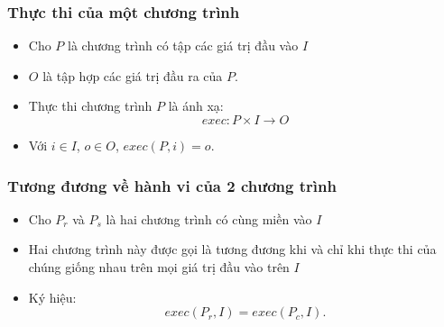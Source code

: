 \documentclass{beamer}
\begin{document}
\begin{frame}
  \frametitle{Thực thi của một chương trình}
\begin{block}{}
	\begin{itemize}
		\item Cho $P$ là chương trình có tập các giá trị đầu vào $I$
		\item $O$ là tập hợp các giá trị đầu ra của $P$. 
		\item Thực thi chương trình $ P $ là ánh xạ: 
		\[exec: P \times I \rightarrow O\]
		\item Với $i \in I$, $o \in O$, $exec(P, i) = o$.
	\end{itemize}
\end{block}
  
\end{frame}


\begin{frame}
  \frametitle{Tương đương về hành vi của 2 chương trình}
  \begin{block}{}
  	\begin{itemize}
  		\item Cho $P_r$ và $P_s$ là hai chương trình có cùng miền vào $I$ 
  		\item Hai chương trình này được gọi là tương đương khi và chỉ
  		khi thực thi của chúng giống nhau trên mọi giá trị đầu vào trên $I$
  		\item Ký hiệu: \[exec(P_r, I) = exec(P_c, I).\]
  	\end{itemize}
  \end{block}
 
\end{frame}
\end{document}
